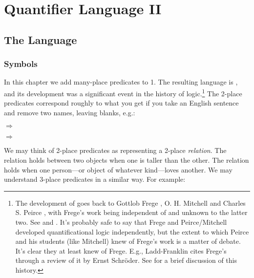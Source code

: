 
\chapter{Quantifier Language II}\label{quantifierlogic}

\section{The Language \GQL{}}


\subsection{Symbols}\label{Sec:GQLSymbols}
In this chapter we add many-place predicates to \GQL{}1.
The resulting language is \GQL{}, and its development was a significant event in the history of logic.\footnote{%
	The development of \GQL{} goes back to Gottlob Frege \citeyearpar{Frege1879,Frege1891,Frege1893}, O. H. Mitchell \citeyearpar{Mitchell1883} and Charles S. Peirce \citeyearpar{Peirce1883}, with Frege's work being independent of and unknown to the latter two. See \citealp[288]{Church1956} and \citealp[34]{Hodges2001}.  %
 It's probably safe to say that Frege and Peirce/Mitchell developed quantificational logic independently, but the extent to which Peirce and his students (like Mitchell) knew of Frege's work is a matter of debate.
It's clear they at least knew of Frege.
E.g., Ladd-Franklin \citeyearpar{LaddFranklin1883} cites Frege's \citeyearpar{Frege1879} through a review of it by Ernst Schr\"oder. 
See \citep{Dipert1984} for a brief discussion of this history.}
The 2-place predicates correspond roughly to what you get if you take an English sentence and remove two names, leaving blanks, e.g.:

\begin{RESTARTmenumerate}
	\item {} $\Rightarrow$ 
	\item {} $\Rightarrow$ 
\end{RESTARTmenumerate}

\noindent{}We may think of 2-place predicates as representing a 2-place \emph{relation}.
The  relation holds between two objects when one is taller than the other.
The  relation holds when one person---or object of whatever kind---loves another.
We may understand 3-place predicates in a similar way.
For example:

